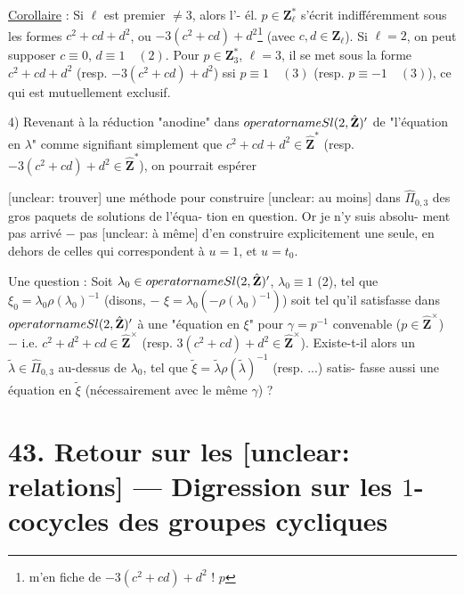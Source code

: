 \begin{enumerate}
\underline{Corollaire} : Si $\ell$ est premier $\neq 3$, alors l'-
él. $p \in \mathbf{Z}_{\ell}^*$ s'écrit indifféremment sous les formes
$c^2 + cd + d^2$, ou $-3(c^2 + cd) + d^2$\footnote{m'en fiche de $-3(c^2+cd)+d^2$ ! $p$} (avec $c,d \in \mathbf{Z}_{\ell}$). Si
$\ell = 2$, on peut supposer $c \equiv 0$, $d \equiv 1 \quad (2)$. Pour
$p \in \mathbf{Z}_3^*$, $\ell = 3$, il se met sous la forme
$c^2 + cd + d^2$ (resp. $-3(c^2 + cd) + d^2$) ssi $p \equiv 1 \quad (3)$
(resp. $p \equiv -1 \quad (3)$), ce qui est mutuellement
exclusif.

4) Revenant à la réduction "anodine" dans
$\\operatorname{Sl}(2, \hat{\mathbf{Z}})'$ de "l'équation en $\lambda$" comme
signifiant simplement que $c^2 + cd + d^2 \in \hat{\mathbf{Z}}^*$
(resp. $-3(c^2 + cd) + d^2 \in \hat{\mathbf{Z}}^*$), on pourrait espérer

\newpage


[unclear: trouver] une méthode pour construire [unclear: au moins] dans
$\hat{\Pi}_{0,3}$ des gros paquets de solutions de l'équa-
tion en question. Or je n'y suis absolu-
ment pas arrivé $-$ pas [unclear: à même] d'en construire
explicitement une seule, en dehors de celles
qui correspondent à $u=1$, et $u=t_0$.

Une question : Soit $\lambda_0 \in \\operatorname{Sl}(2, \hat{\mathbf{Z}})'$, $\lambda_0 \equiv 1$ (2), tel que
$\xi_0 = \lambda_0 \rho(\lambda_0)^{-1}$ (disons, $-$ $\xi = \lambda_0(-\rho(\lambda_0)^{-1})$) soit tel qu'il
satisfasse dans $\\operatorname{Sl}(2, \hat{\mathbf{Z}})'$ à une "équation en $\xi$"
pour $\gamma = p^{-1}$ convenable ($p \in \hat{\mathbf{Z}}^\times$) $-$ i.e.
$c^2 + d^2 + cd \in \hat{\mathbf{Z}}^\times$ (resp. $3(c^2+cd)+d^2 \in \hat{\mathbf{Z}}^\times$).
Existe-t-il alors un $\tilde{\lambda} \in \hat{\Pi}_{0,3}$ au-dessus de
$\lambda_0$, tel que $\tilde{\xi} = \tilde{\lambda} \rho(\tilde{\lambda})^{-1}$ (resp. ...) satis-
fasse aussi une équation en $\tilde{\xi}$ (nécessairement
avec le même $\gamma$) ?

\newpage


\section*{43. Retour sur les [unclear: relations] --- Digression sur les $1$-cocycles des groupes cycliques}


\end{enumerate}
